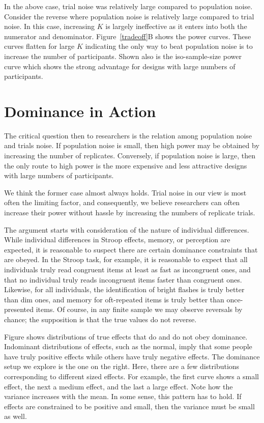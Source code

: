 \documentclass[fignum,nobf,man]{apa}
\begin{document}
In the above case, trial noise was relatively large compared to population noise.  Consider the reverse where population noise is relatively large compared to trial noise.  In this case, increasing $K$ is largely ineffective as it enters into both the numerator and denominator.  Figure~\ref{tradeoff}B shows the power curves.   These curves flatten for large $K$ indicating the only way to beat population noise is to increase the number of participants.  Shown also is the iso-sample-size power curve which shows the strong advantage for designs with large numbers of participants.


\section{Dominance in Action}
The critical question then to researchers is the relation among population noise and trials noise.  If population noise is small, then high power may be obtained by increasing the number of replicates.  Conversely, if population noise is large, then the only route to high power is the more expensive and less attractive designs with large numbers of participants.

We think the former case almost always holds.  Trial noise in our view is most often the limiting factor, and consequently, we believe researchers can often increase their power without hassle by increasing the numbers of replicate trials.  

The argument starts with consideration of the nature of individual differences.  While individual differences in Stroop effects, memory, or perception are expected, it is reasonable to suspect there are certain dominance constraints that are obeyed.  In the Stroop task, for example, it is reasonable to expect that all individuals truly read congruent items at least as fast as incongruent ones, and that no individual truly reads incongruent items faster than congruent ones.  Likewise, for all individuals, the identification of bright flashes is truly better than dim ones, and memory for oft-repeated items is truly better than once-presented items.   Of course, in any finite sample we may observe reversals by chance; the supposition is that the true values do not reverse.

Figure shows distributions of true effects that do and do not obey dominance.  Indominant distributions of effects, such as the normal, imply that some people have truly positive effects while others have truly negative effects.  The dominance setup we explore is the one on the right.  Here, there are a few distributions corresponding to different sized effects.  For example, the first curve shows a small effect, the next a medium effect, and the last a large effect.  Note how the variance increases with the mean.  In some sense, this pattern has to hold.  If effects are constrained to be positive and small, then the variance must be small as well. 
\end{document}
